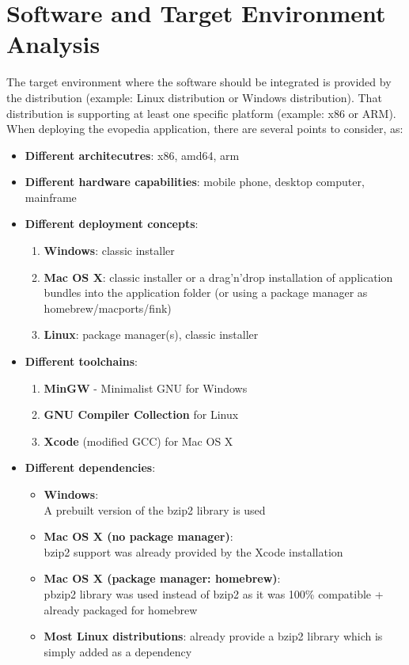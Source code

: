 \documentclass[a4paper,10pt]{article}
\begin{document}
\newpage
\section{Software and Target Environment Analysis}
\label{SoftwareAndTargetEnvirontmentAnalysis}
The target environment where the software should be integrated is provided by the distribution (example: Linux distribution or Windows distribution). That distribution is supporting at least one specific platform (example: x86 or ARM). When deploying the evopedia application, there are several points to consider, as:
\begin{itemize}
 \item \textbf{Different architecutres}: x86, amd64, arm
 \item \textbf{Different hardware capabilities}: mobile phone, desktop computer, mainframe
 \item \textbf{Different deployment concepts}: 
\begin{enumerate}
 \item \textbf{Windows}: classic installer
 \item \textbf{Mac OS X}: classic installer or a drag'n'drop installation of application bundles into the application folder (or using a package manager as homebrew/macports/fink)
 \item \textbf{Linux}: package manager(s), classic installer
\end{enumerate}
 \item \textbf{Different toolchains}: 
\begin{enumerate}
 \item \textbf{MinGW} - Minimalist GNU for Windows
 \item \textbf{GNU Compiler Collection} for Linux
 \item \textbf{Xcode} (modified GCC) for Mac OS X
\end{enumerate}

 \item \textbf{Different dependencies}:
\begin{itemize}
 \item \textbf{Windows}:\\ A prebuilt version of the bzip2 library is used
 \item \textbf{Mac OS X (no package manager)}:\\ bzip2 support was already provided by the Xcode installation
 \item \textbf{Mac OS X (package manager: homebrew)}:\\ pbzip2 library was used instead of bzip2 as it was 100\% compatible + already packaged for homebrew
 \item \textbf{Most Linux distributions}: already provide a bzip2 library which is simply added as a dependency
\end{itemize}
 

\end{itemize}
\end{document}
